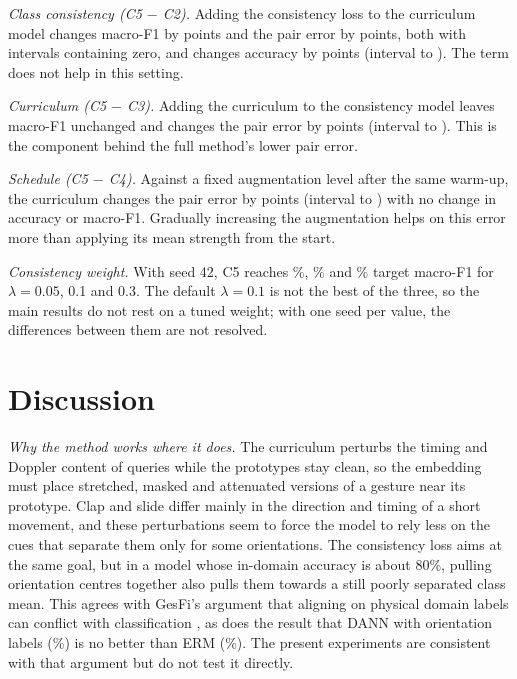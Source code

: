 \documentclass[conference]{IEEEtran}
\begin{document}
\textit{Class consistency (C5 $-$ C2).} Adding the consistency loss to the curriculum model changes macro-F1 by \DFiveTwoFone{} points and the pair error by \DFiveTwoCS{} points, both with intervals containing zero, and changes accuracy by \DFiveTwoAcc{} points (interval \DFiveTwoAccLo{} to \DFiveTwoAccHi). The term does not help in this setting.

\textit{Curriculum (C5 $-$ C3).} Adding the curriculum to the consistency model leaves macro-F1 unchanged and changes the pair error by \DFiveThreeCS{} points (interval \DFiveThreeCSLo{} to \DFiveThreeCSHi). This is the component behind the full method's lower pair error.

\textit{Schedule (C5 $-$ C4).} Against a fixed augmentation level after the same warm-up, the curriculum changes the pair error by \DFiveFourCS{} points (interval \DFiveFourCSLo{} to \DFiveFourCSHi) with no change in accuracy or macro-F1. Gradually increasing the augmentation helps on this error more than applying its mean strength from the start.

\textit{Consistency weight.} With seed 42, C5 reaches \LamLowFone\%, \LamMidFone\% and \LamHighFone\% target macro-F1 for $\lambda=0.05$, 0.1 and 0.3. The default $\lambda=0.1$ is not the best of the three, so the main results do not rest on a tuned weight; with one seed per value, the differences between them are not resolved.

\section{Discussion}\label{sec:discussion}
\textit{Why the method works where it does.} The curriculum perturbs the timing and Doppler content of queries while the prototypes stay clean, so the embedding must place stretched, masked and attenuated versions of a gesture near its prototype. Clap and slide differ mainly in the direction and timing of a short movement, and these perturbations seem to force the model to rely less on the cues that separate them only for some orientations. The consistency loss aims at the same goal, but in a model whose in-domain accuracy is about 80\%, pulling orientation centres together also pulls them towards a still poorly separated class mean. This agrees with GesFi's argument that aligning on physical domain labels can conflict with classification \cite{zhang2026gesfi}, as does the result that DANN with orientation labels (\BthreeAcc\%) is no better than ERM (\BoneAcc\%). The present experiments are consistent with that argument but do not test it directly.
\end{document}
